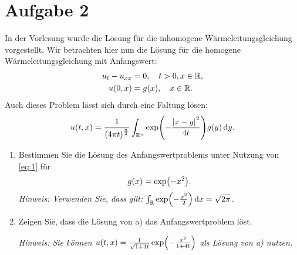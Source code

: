 \documentclass{exercise}
\begin{document}
    \section*{Aufgabe 2}
    
    \begin{problem}
        In der Vorlesung wurde die Lösung für die inhomogene Wärmeleitungsgleichung vorgestellt.
        Wir betrachten hier nun die Lösung für die homogene Wärmeleitungsgleichung mit Anfangswert:
        \begin{align*}
            u_t - u_{xx} &= 0, \quad t > 0, x \in \R,\\
            u\parentheses*{0, x} &= g\parentheses*{x}, \quad x \in \R.
        \end{align*}
        Auch dieses Problem lässt sich durch eine Faltung lösen:
        \begin{equation}\label{eq:1}
            u\parentheses*{t, x} = \frac{1}{\parentheses*{4\pi t}^{\frac{n}{2}}}\int_{\R^n}\exp\parentheses*{-\frac{\absolute*{x - y}^2}{4t}}g\parentheses*{y}\d y.
        \end{equation}
        \begin{enumerate}
            \item Bestimmen Sie die Lösung des Anfangswertproblems unter Nutzung von \eqref{eq:1} für
            \[
                g\parentheses*{x} = \exp\parentheses*{-x^2}.
            \]
            \emph{Hinweis: Verwenden Sie, dass gilt: \(\int_\R \exp\parentheses*{-\frac{x^2}{2}}\d x = \sqrt{2\pi}\).}
            \item Zeigen Sie, dass die Lösung von a) das Anfangswertproblem löst.

            \emph{Hinweis: Sie können \(u\parentheses*{t, x} = \frac{1}{\sqrt{1 + 4t}}\exp\parentheses*{-\frac{x^2}{1 + 4t}}\) als Lösung von a) nutzen.}
        \end{enumerate}
    \end{problem}
    
\end{document}
